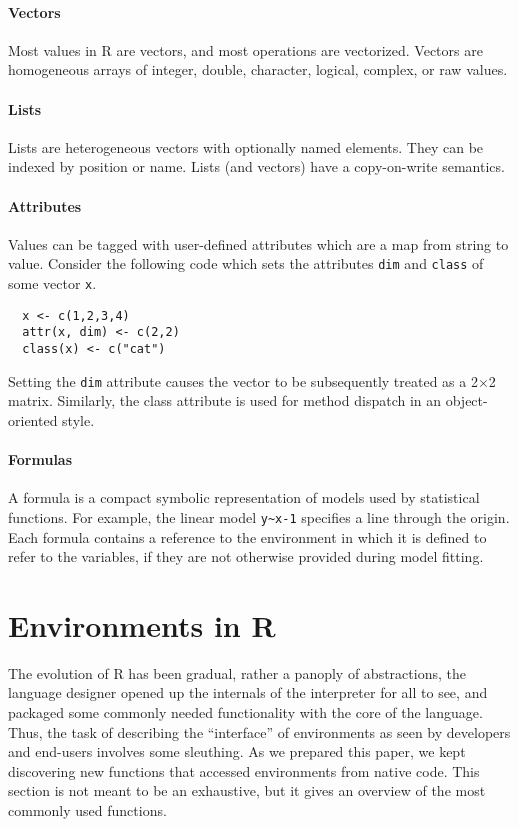 \documentclass[10pt,review,sigplan,authorversion=true]{acmart}
\newcommand{\code}[1]{\lstinline |#1|\xspace}
\renewcommand{\c}[1]{\lstinline |#1|\xspace}
\begin{document}
\paragraph{Vectors}  Most values in R are vectors, and most operations are
vectorized. Vectors are homogeneous arrays of integer, double, character,
logical, complex, or raw values.

\paragraph{Lists} Lists are heterogeneous vectors with optionally named elements.
They can be indexed by position or name. Lists (and vectors) have a
copy-on-write semantics.

\paragraph{Attributes}
Values can be tagged with user-defined attributes which are a map from string to
value. Consider the following code which sets the attributes \code{dim} and
\c{class} of some vector \code{x}.

\begin{lstlisting}
  x <- c(1,2,3,4)
  attr(x, dim) <- c(2,2)
  class(x) <- c("cat")
\end{lstlisting}
\noindent
Setting the \code{dim} attribute causes the vector to be subsequently treated as
a 2$\times$2 matrix. Similarly, the class attribute is used for method dispatch
in an object-oriented style.

\paragraph{Formulas}  A formula is a compact symbolic representation of models
used by statistical functions. For example, the linear model \code{y~x-1}
specifies a line through the origin. Each formula contains a reference to the
environment in which it is defined to refer to the variables, if they are not
otherwise provided during model fitting.

\section{Environments in R}

The evolution of R has been gradual, rather a panoply of abstractions, the
language designer opened up the internals of the interpreter for all to see, and
packaged some commonly needed functionality with the core of the language. Thus,
the task of describing the ``interface'' of environments as seen by developers
and end-users involves some sleuthing. As we prepared this paper, we kept
discovering new functions that accessed environments from native code. This
section is not meant to be an exhaustive, but it gives an overview of the most
commonly used functions.
\end{document}
